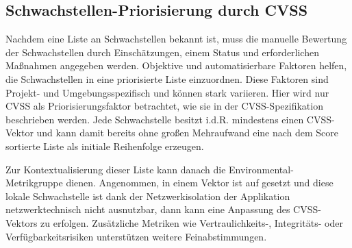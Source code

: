 \subsection{Schwachstellen-Priorisierung durch CVSS} \label{subsec:projektbericht-grundlagen-vulnerability-assessment}

Nachdem eine Liste an Schwachstellen bekannt ist, muss die manuelle Bewertung der Schwachstellen durch Einschätzungen, einem Status und erforderlichen Maßnahmen angegeben werden.
Objektive und automatisierbare Faktoren helfen, die Schwachstellen in eine priorisierte Liste einzuordnen.
Diese Faktoren sind Projekt- und Umgebungsspezifisch und können stark variieren.
Hier wird nur CVSS als Priorisierungsfaktor betrachtet, wie sie in der CVSS-Spezifikation beschrieben werden.
Jede Schwachstelle besitzt i.d.R. mindestens einen CVSS-Vektor und kann damit bereits ohne großen Mehraufwand eine nach dem Score sortierte Liste als initiale Reihenfolge erzeugen.

Zur Kontextualisierung dieser Liste kann danach die Environmental-Metrikgruppe dienen.
Angenommen, in einem Vektor ist  auf  gesetzt und diese lokale Schwachstelle ist dank der Netzwerkisolation der Applikation netzwerktechnisch nicht ausnutzbar, dann kann eine Anpassung des CVSS-Vektors zu  erfolgen.
Zusätzliche Metriken wie Vertraulichkeits-, Integritäts- oder Verfügbarkeitsrisiken unterstützen weitere Feinabstimmungen.
